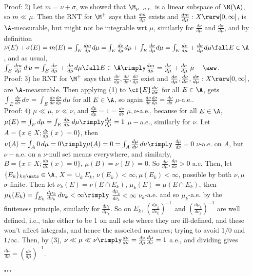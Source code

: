 \noindent
Proof: 2) Let $m = \nu + \sigma$, we showed that $\M_{\mu-a.c.}$ is a linear subspace of $\M(\A)$, so $m \ll \mu$. Then the RNT for $\M^+$ says that $\frac{dm}{d\mu}$ exists and $\frac{dm}{d\mu}: X \rarw [0,\infty]$, is $\A$-measurable, but might not be integrable wrt $\mu$, similarly for $\frac{d\nu}{d\mu}$ and $\frac{d\sigma}{d\mu}$, and by definition $\nu(E) + \sigma(E) = m(E) = \int_E \frac{dm}{d\mu} d\mu = \int_E \frac{d\nu}{d\mu} d\mu + \int_E \frac{d\sigma}{d\mu} d\mu = \int_E \frac{d\nu}{d\mu} + \frac{d\sigma}{d\mu} d\mu \fall E \in \A$, and as usual, $\int_E \frac{dm}{d\mu} \, d\,u = \int_E \frac{d\nu}{d\mu} + \frac{d\sigma}{d\mu} d\mu \fall E \in \A \rimply \frac{dm}{d\mu} = \frac{d\nu}{d\mu} + \frac{d\sigma}{d\mu} \; \mu - \aew$.  \\


\noindent
Proof: 3)  he RNT for $\M^+$ says that $\frac{d\nu}{d\mu},\frac{d\nu}{d\sigma},\frac{d\sigma}{d\mu} $ exist and $\frac{d\nu}{d\mu},\frac{d\nu}{d\sigma},\frac{d\sigma}{d\mu}: X \rarw [0,\infty]$, are $\A$-measurable. Then applying (1) to $\cf{E}\frac{d\nu}{d\sigma}$ for all $E \in \A$, gets $ \int_E \frac{d\nu}{d\sigma} \, d\sigma = \int_E \frac{d\nu}{d\sigma} \frac{d\sigma}{d\mu} \, d\mu$ for all $E \in \A$, so again $ \frac{d\nu}{d\sigma} \frac{d\sigma}{d\mu}  = \frac{d\nu}{d\sigma}$ $\mu$-a.e..\\


\noindent
Proof: 4) $\mu \ll \mu$, $\nu \ll \nu$, and $\frac{d\mu}{d\mu} = 1 = \frac{d\nu}{d\nu}$ $\mu,\nu$-a.e., because for all $E \in \A$, $\mu(E) = \int_E d\mu = \int_E \frac{d\mu}{d\mu} \, d\mu \rimply \frac{d\mu}{d\mu} = 1$ $\mu-$a.e., similarly for $\nu$.  Let $A = \{ x \in X; \frac{d\nu}{d\mu} (x) = 0 \}$, then $\nu(A) = \int_A 0 \, d\mu = 0 \rimply \mu(A) = 0 = \int_A \frac{d\mu}{d\nu} \, d\nu \rimply$ $ \frac{d\mu}{d\nu} = 0$ $\nu$-a.e. on $A$, but $\nu-$a.e. on a $\nu$-null set means everywhere, and similarly, $B = \{ x \in X; \frac{d\mu}{d\nu} (x) = 0 \}$, $\mu(B) = \nu(B) = 0$. So $\frac{d\nu}{d\mu}, \frac{d\mu}{d\nu} > 0$ a.e. Then, let $\{E_k \}_{k \in \nats} \in \A$, $X = \cup_k E_k$, $\nu(E_k) < \infty, \mu(E_k) < \infty$, possible by both $\nu, \mu$ $\sigma$-finite. Then let $\nu_k(E) = \nu(E \cap E_k)$, $\mu_k(E) = \mu(E \cap E_k)$, then $\mu_k(E_k) = \int_{E_k} \frac{d\mu_k}{d\nu_k} \, d\nu_k < \infty \rimply$ $\frac{d\mu_k}{d\nu_k} < \infty$ $\nu_k$-a.e. and so $\mu_k$-a.e. by the finiteness principle, similarly for $\frac{d\nu_k}{d\mu_k}$. So on $E_k$, $\left( \frac{d\mu_k}{d\nu_k} \right) ^{-1}$ and $\left( \frac{d\mu_k}{d\nu_k} \right) ^{-1}$ are well defined, i.e., take either to be 1 on null sets where they are ill-defined, and these won't affect integrals, and hence the associted measures; trying to avoid $1/0$ and $1/\infty$. Then, by (3), $ \nu \ll \mu \ll \nu \rimply \frac{d\nu}{d\nu}= \frac{d\nu}{d\mu}\frac{d\mu}{d\nu} = 1$ a.e., and dividing gives $\frac{d\mu}{d\nu} = \left( \frac{d\nu}{d\mu} \right)^{-1}$.




"""
